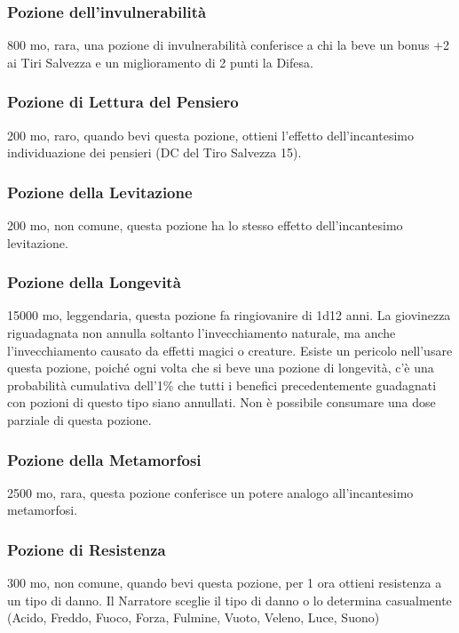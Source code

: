 \begin{multicols}{2}
	\subsubsection*{Pozione dell’invulnerabilità}
	800 mo, rara, una pozione di invulnerabilità conferisce a chi la beve un bonus +2 ai Tiri Salvezza e un miglioramento di 2 punti la Difesa.

	\subsubsection*{Pozione di Lettura del Pensiero}
	200 mo, raro, quando bevi questa pozione, ottieni l'effetto dell'incantesimo individuazione dei pensieri (DC del Tiro Salvezza 15).

	\subsubsection*{Pozione della Levitazione}
	200 mo, non comune, questa pozione ha lo stesso effetto dell’incantesimo levitazione.

	\subsubsection*{Pozione della Longevità}
	15000 mo, leggendaria, questa pozione fa ringiovanire di 1d12 anni. La giovinezza riguadagnata non annulla soltanto l'invecchiamento naturale, ma anche l’invecchiamento causato da effetti magici o creature. Esiste un pericolo nell'usare questa pozione, poiché ogni volta che si beve una pozione di longevità, c'è una probabilità cumulativa dell’1\% che tutti i benefici precedentemente guadagnati con pozioni di questo tipo siano annullati. Non è possibile consumare una dose parziale di questa pozione.

	\subsubsection*{Pozione della Metamorfosi}
	2500 mo, rara, questa pozione conferisce un potere analogo all’incantesimo metamorfosi.

	\subsubsection*{Pozione di Resistenza}
	300 mo, non comune, quando bevi questa pozione, per 1 ora ottieni resistenza a un tipo di danno. Il Narratore sceglie il tipo di danno o lo determina casualmente (Acido, Freddo, Fuoco, Forza, Fulmine, Vuoto, Veleno, Luce, Suono)


\end{multicols}
